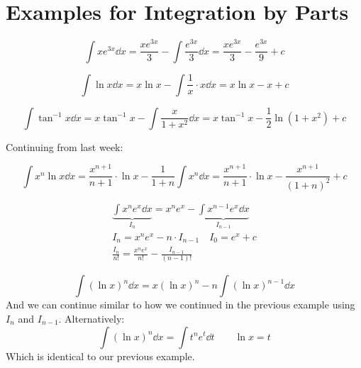 \documentclass[00_complete]{subfiles}
\begin{document}
\section{Examples for Integration by Parts}
\setcounter{example}{0}
\begin{example}
    $$
    \int xe^{3x}\dd{x}
    =\frac{xe^{3x}}{3}-\int \frac{e^{3x}}{3}\dd{x}
    =\frac{xe^{3x}}{3}-\frac{e^{3x}}{9}+c
    $$
\end{example}
\begin{example}
    $$
    \int \ln x \dd{x}
    =x\ln x - \int \frac{1}{x}\cdot x \dd{x} = x\ln x - x +c
    $$
\end{example}
\begin{example}
    $$
    \int \tan^{-1}x\dd{x}
    =x\tan^{-1}x - \int \frac{x}{1+x^2} \dd{x}
    =x\tan^{-1}x - \frac{1}{2}\ln(1+x^2)+c
    $$
\end{example}
\setcounter{example}{0}
Continuing from last week:
\begin{example}
    $$
        \int x^n \ln x \dd{x} =
        \frac{x^{n+1}}{n+1}\cdot \ln x - \frac{1}{1+n} \int x^n \dd{x} =
        \frac{x^{n+1}}{n+1}\cdot \ln x - \frac{x^{n+1}}{(1+n)^2} + c
    $$
\end{example}
\begin{example}
    $$
    \begin{gathered}
        \underbrace{\int x^ne^x \dd{x}}_{I_n} = x^ne^x - \underbrace{\int
        x^{n-1}e^x\dd{x}}_{I_{n-1}} \\
        I_n = x^ne^x -n\cdot I_{n-1} \quad I_0=e^x+c \\
        \frac{I_n}{n!}=\frac{x^ne^x}{n!}-\frac{I_{n-1}}{(n-1)!}
    \end{gathered}
    $$
\end{example}
\begin{example}
    $$
        \int (\ln x)^n \dd{x} =
        x(\ln x)^n - n \int (\ln x)^{n-1} \dd{x}
    $$
    And we can continue similar to how we  continued in the previous example
    using $I_n$ and $I_{n-1}$. Alternatively:
    $$
        \int (\ln x)^n \dd{x} =
        \int t^ne^t\dd{t} \qquad \ln x = t
    $$
    Which is identical to our previous example.
\end{example}
\end{document}
